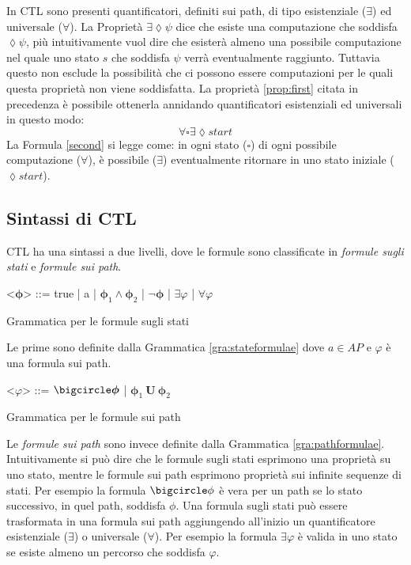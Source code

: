 \documentclass[a4paper, 10pt]{article}
\numberwithin{equation}{theor}
\begin{document}
In \ac{CTL} sono presenti quantificatori, definiti sui path, di tipo esistenziale ($\exists$) ed universale ($\forall$). La Proprietà $\exists\lozenge \psi$ dice che esiste una computazione che soddisfa $\lozenge\psi$, più intuitivamente vuol dire che esisterà almeno una possibile computazione nel quale uno stato $s$ che soddisfa $\psi$ verrà eventualmente raggiunto. Tuttavia questo non esclude la possibilità che ci possono essere computazioni per le quali questa proprietà non viene soddisfatta.
La proprietà \ref{prop:first} citata in precedenza è possibile ottenerla annidando quantificatori esistenziali ed universali in questo modo:
\begin{equation}
\label{second}
\forall\square\exists\lozenge start
\end{equation}
La Formula \eqref{second} si legge come: in ogni stato ($\square$) di ogni possibile computazione ($\forall$), è possibile ($\exists$) eventualmente ritornare in uno stato iniziale ($\lozenge start$).


\subsection{Sintassi di \ac{CTL}} 
\ac{CTL} ha una sintassi a due livelli, dove le formule sono classificate in \textit{formule sugli stati} e \textit{formule sui path}. 

\begin{Grammar}
	\begin{grammar}	
	
	\centering
	<$\boldsymbol{\phi}$> ::= true | a | $\boldsymbol{\phi}_{1} \wedge \boldsymbol{\phi}_{2}$ | $\neg \boldsymbol{\phi}$ | $	\exists \varphi$ | $\forall \varphi$ 
	
	\end{grammar}
	\caption{Grammatica per le formule sugli stati}\label{gra:stateformulae}
\end{Grammar}
Le prime sono definite dalla Grammatica \ref{gra:stateformulae} dove $a \in AP$ e $\varphi$ è una formula sui path.
\begin{Grammar}
	\begin{grammar}	
	
	\centering
	<$\varphi$> ::= $\bigcircle \boldsymbol{\phi}$ | $\boldsymbol{\phi}_{1}\ \boldsymbol{U}\  \boldsymbol{\phi}_{2}$ 
	
	\end{grammar}
	\caption{Grammatica per le formule sui path}\label{gra:pathformulae}
\end{Grammar}
Le \textit{formule sui path} sono invece definite dalla Grammatica \ref{gra:pathformulae}.
Intuitivamente si può dire che le formule sugli stati esprimono una proprietà su uno stato, mentre le formule sui path esprimono proprietà sui infinite sequenze di stati. Per esempio la formula $\bigcircle \phi$ è vera per un path se lo stato successivo, in quel path, soddisfa $\phi$. Una formula sugli stati può essere trasformata in una formula sui path aggiungendo all'inizio un quantificatore esistenziale ($\exists$) o universale ($\forall$). Per esempio la formula $\exists \varphi$ è valida in uno stato se esiste almeno un percorso che soddisfa $\varphi$.
\end{document}
